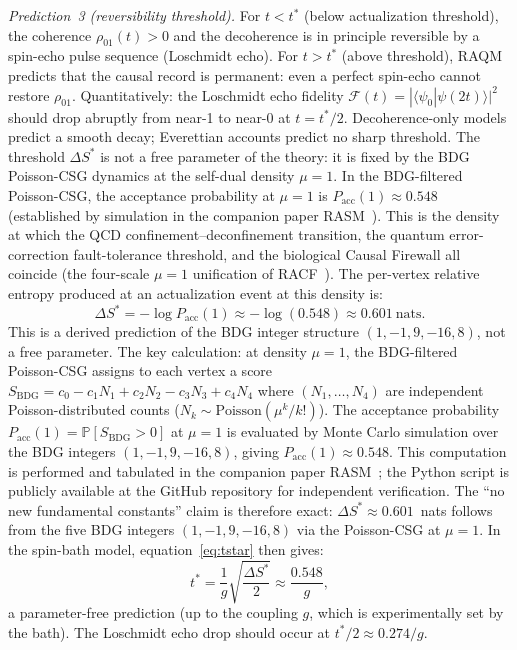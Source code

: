 \documentclass[11pt,a4paper]{article}
\theoremstyle{plain}
\theoremstyle{definition}
\theoremstyle{remark}
\begin{document}
\emph{Prediction~3 (reversibility threshold).} For $t < t^*$ (below actualization
threshold), the coherence $\rho_{01}(t) > 0$ and the decoherence is in principle
reversible by a spin-echo pulse sequence (Loschmidt echo). For $t > t^*$
(above threshold), RAQM predicts that the causal record is permanent: even a
perfect spin-echo cannot restore $\rho_{01}$. Quantitatively: the Loschmidt
echo fidelity $\mathcal{F}(t) = |\langle\psi_0|\psi(2t)\rangle|^2$ should
drop abruptly from near-1 to near-0 at $t = t^*/2$. Decoherence-only models
predict a smooth decay; Everettian accounts predict no sharp threshold.
The threshold $\Delta S^*$ is not a free parameter of the theory: it is
fixed by the BDG Poisson-CSG dynamics at the self-dual density $\mu = 1$.
In the BDG-filtered Poisson-CSG, the acceptance probability at $\mu = 1$ is
$P_{\mathrm{acc}}(1) \approx 0.548$ (established by simulation in
the companion paper RASM~\citep{Sandeman2026RASM}). This is the density at
which the QCD confinement--deconfinement transition, the quantum
error-correction fault-tolerance threshold, and the biological Causal
Firewall all coincide (the four-scale $\mu = 1$ unification of
RACF~\citep{Sandeman2026RACF}). The per-vertex relative entropy produced
at an actualization event at this density is:
\begin{equation}
  \Delta S^* = -\log P_{\mathrm{acc}}(1) \approx -\log(0.548)
  \approx 0.601~\text{nats}.
  \label{eq:Sstar}
\end{equation}
This is a derived prediction of the BDG integer structure $(1,-1,9,-16,8)$,
not a free parameter. The key calculation: at density $\mu = 1$, the
BDG-filtered Poisson-CSG assigns to each vertex a score
$S_{\mathrm{BDG}} = c_0 - c_1 N_1 + c_2 N_2 - c_3 N_3 + c_4 N_4$
where $(N_1,\ldots,N_4)$ are independent Poisson-distributed counts
($N_k \sim \mathrm{Poisson}(\mu^k/k!)$). The acceptance probability
$P_{\mathrm{acc}}(1) = \mathbb{P}[S_{\mathrm{BDG}} > 0]$ at $\mu=1$
is evaluated by Monte Carlo simulation over the BDG integers
$(1,-1,9,-16,8)$, giving $P_{\mathrm{acc}}(1) \approx 0.548$.
This computation is performed and tabulated in the companion paper
RASM~\citep{Sandeman2026RASM}; the Python script is publicly available
at the GitHub repository for independent verification.
The ``no new fundamental constants'' claim is therefore
exact: $\Delta S^* \approx 0.601$~nats follows from the five BDG integers
$(1,-1,9,-16,8)$ via the Poisson-CSG at $\mu = 1$.
In the spin-bath model, equation~\eqref{eq:tstar} then gives:
\begin{equation}
  t^* = \frac{1}{g}\sqrt{\frac{\Delta S^*}{2}}
  \approx \frac{0.548}{g},
  \label{eq:tstar_derived}
\end{equation}
a parameter-free prediction (up to the coupling $g$, which is experimentally
set by the bath). The Loschmidt echo drop should occur at
$t^*/2 \approx 0.274/g$.
\end{document}
